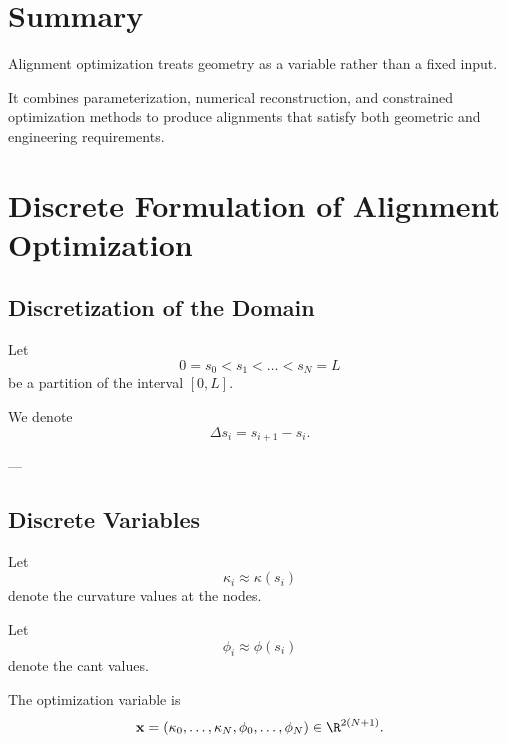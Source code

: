 \section{Summary}

\begin{summary}
Alignment optimization treats geometry as a variable rather than a fixed
input.

It combines parameterization, numerical reconstruction, and constrained
optimization methods to produce alignments that satisfy both geometric
and engineering requirements.
\end{summary}

\section{Discrete Formulation of Alignment Optimization}

\subsection{Discretization of the Domain}

\begin{definition}[Discretization]
Let
\[
0 = s_0 < s_1 < \dots < s_N = L
\]
be a partition of the interval \([0,L]\).
\end{definition}

\begin{remark}
We denote
\[
\Delta s_i = s_{i+1} - s_i.
\]
\end{remark}

---

\subsection{Discrete Variables}

\begin{definition}
Let
\[
\kappa_i \approx \kappa(s_i)
\]
denote the curvature values at the nodes.
\end{definition}

\begin{definition}
Let
\[
\phi_i \approx \phi(s_i)
\]
denote the cant values.
\end{definition}

\begin{definition}
The optimization variable is
\[
\mathbf{x}
=
(\kappa_0,\dots,\kappa_N,\phi_0,\dots,\phi_N) \in \R^{2(N+1)}.
\]
\end{definition}

